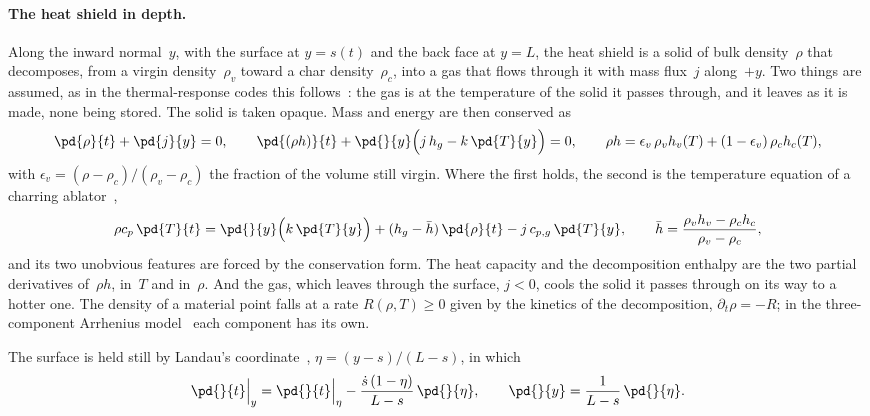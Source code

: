 \paragraph{The heat shield in depth.}
Along the inward normal~$y$, with the surface at $y = s(t)$ and the back
face at $y = L$, the heat shield is a solid of bulk density~$\rho$ that
decomposes, from a virgin density~$\rho_v$ toward a char
density~$\rho_c$, into a gas that flows through it with mass flux~$j$
along~$+y$. Two things are assumed, as in the thermal-response codes this
follows~\cite{chen1999ablation}: the gas is at the temperature of the solid
it passes through, and it leaves as it is made, none being stored. The
solid is taken opaque. Mass and energy are then conserved as
\begin{equation}\label{eq:slab-conservation}
  \pd{\rho}{t} + \pd{j}{y} = 0,
  \qquad
  \pd{(\rho h)}{t} + \pd{}{y}\Bigl(j\,h_g - k\,\pd{T}{y}\Bigr) = 0,
  \qquad
  \rho h = \epsilon_v\,\rho_v h_v(T) + (1-\epsilon_v)\,\rho_c h_c(T),
\end{equation}
with $\epsilon_v = (\rho-\rho_c)/(\rho_v-\rho_c)$ the fraction of the volume
still virgin. Where the first holds, the second is the temperature equation
of a charring ablator~\cite[Eq.~(1)]{chen1999ablation},
\begin{equation}\label{eq:slab-temperature}
  \rho c_p\,\pd{T}{t}
  = \pd{}{y}\Bigl(k\,\pd{T}{y}\Bigr)
    + (h_g - \bar h)\,\pd{\rho}{t}
    - j\,c_{p,g}\,\pd{T}{y},
  \qquad
  \bar h = \frac{\rho_v h_v - \rho_c h_c}{\rho_v - \rho_c} ,
\end{equation}
and its two unobvious features are forced by the conservation form. The
heat capacity and the decomposition enthalpy are the two partial
derivatives of~$\rho h$, in~$T$ and in~$\rho$. And the gas, which leaves
through the surface, $j<0$, cools the solid it passes through on its way to
a hotter one. The density of a material point falls at a rate
$R(\rho,T)\ge0$ given by the kinetics of the decomposition,
$\partial_t\rho = -R$; in the three-component Arrhenius
model~\cite[Eq.~(8)]{chen1999ablation} each component has its own.

The surface is held still by Landau's
coordinate~\cite{landau1950heat}, $\eta = (y-s)/(L-s)$, in which
\begin{equation}\label{eq:landau}
  \pd{}{t}\Big|_{y} = \pd{}{t}\Big|_{\eta}
     - \frac{\dot s\,(1-\eta)}{L-s}\,\pd{}{\eta},
  \qquad
  \pd{}{y} = \frac{1}{L-s}\,\pd{}{\eta} .
\end{equation}

